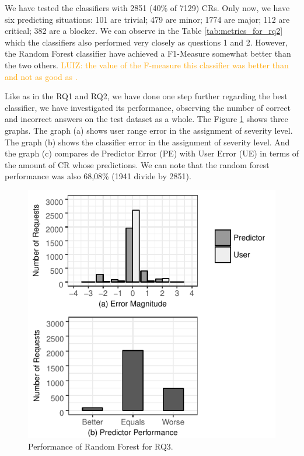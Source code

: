 \documentclass[10pt, conference]{IEEEtran}
\newcommand{\luiz}[1]{\noindent\textcolor{orange}{LUIZ: {#1}}}
\newcommand{\luiz}[1]{}
\begin{document}
We have tested the classifiers with 2851 (40\% of 7129) CRs. Only now, we have six predicting situations: 101 are trivial; 479 are minor; 1774 are major; 112 are critical; 382 are a blocker. We can observe in the Table \ref{tab:metrics_for_rq2} which the classifiers also performed very closely as questions 1 and 2. However, the Random Forest classifier have achieved a F1-Measure somewhat better than the two others. \luiz{the value of the F-measure this classifier was better than \cite{Tian2012} and not as good as \cite{Menzies2008}.}

Like as in the RQ1 and RQ2, we have done one step further regarding the best classifier, we have investigated its performance, observing the number of correct and incorrect answers on the test dataset as a whole. The Figure \ref{fig:rf_performance_for_q3} shows three graphs. The graph (a) shows user range error in the assignment of severity level. The graph (b) shows the classifier error in the assignment of severity level. And the graph (c) compares de Predictor Error (PE) with User Error (UE) in terms of the amount of CR whose predictions. We can note that the random forest performance was also 68,08\% (1941 divide by 2851). 


\begin{figure}[ht]
  \label{fig:rf_performance_for_q3}
  \includegraphics{figures/rf_performance_for_q3.pdf}
  \caption{Performance of Random Forest for RQ3.}
\end{figure}
\end{document}

